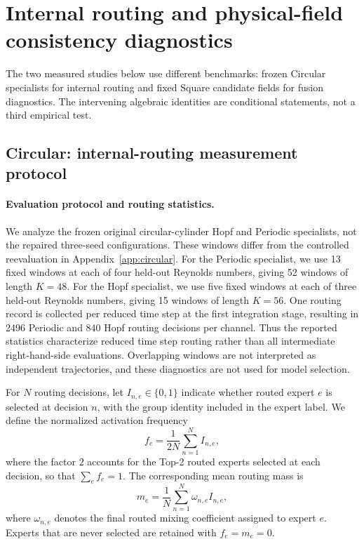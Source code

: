 \section{Internal routing and physical-field consistency diagnostics}
\label{app:routing_physics}

The two measured studies below use different benchmarks: frozen Circular
specialists for internal routing and fixed Square candidate fields for
fusion diagnostics. The intervening algebraic identities are conditional
statements, not a third empirical test.

\subsection{Circular: internal-routing measurement protocol}
\label{app:internal_routing}

\paragraph{Evaluation protocol and routing statistics.}
We analyze the frozen original circular-cylinder Hopf and Periodic specialists, not the repaired three-seed configurations. These windows differ from the controlled reevaluation in Appendix~\ref{app:circular}.
For the Periodic specialist, we use 13 fixed windows at each of four held-out Reynolds numbers, giving 52 windows of length $K=48$. For the Hopf specialist, we use five fixed windows at each of three held-out Reynolds numbers, giving 15 windows of length $K=56$. One routing record is collected per reduced time step at the first integration stage, resulting in 2496 Periodic and 840 Hopf routing decisions per channel. Thus the reported statistics characterize reduced time step routing rather than all intermediate right-hand-side evaluations. Overlapping windows are not interpreted as independent trajectories, and these diagnostics are not used for model selection.

For $N$ routing decisions, let $I_{n,e}\in\{0,1\}$ indicate whether routed expert $e$ is selected at decision $n$, with the group identity included in the expert label. We define the normalized activation frequency
\begin{equation}
  f_e
  =
  \frac{1}{2N}
  \sum_{n=1}^{N} I_{n,e},
  \label{eq:app_routing_frequency}
\end{equation}
where the factor $2$ accounts for the Top-2 routed experts selected at each decision, so that $\sum_e f_e=1$. The corresponding mean routing mass is
\begin{equation}
  m_e
  =
  \frac{1}{N}
  \sum_{n=1}^{N}
  \omega_{n,e}I_{n,e},
  \label{eq:app_routing_mass}
\end{equation}
where $\omega_{n,e}$ denotes the final routed mixing coefficient assigned to expert $e$. Experts that are never selected are retained with $f_e=m_e=0$.

